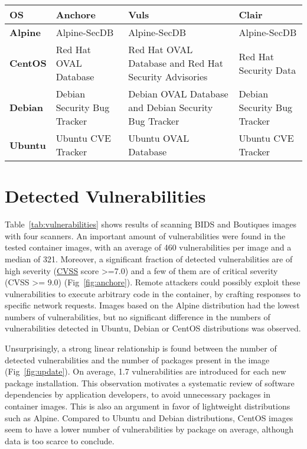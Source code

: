\begin{center}
\tabulinesep=1.2mm
\begin{tabu} to \textwidth { | X[l] | X[l] | X[l] | X[l] | }
 \hline
\textbf{OS} &   \textbf{Anchore} &      \textbf{Vuls} & \textbf{Clair} \\
\hline
        \textbf{Alpine} & Alpine-SecDB &        Alpine-SecDB &  Alpine-SecDB \\
\hline
        \textbf{CentOS} & Red Hat OVAL Database & Red Hat OVAL Database and Red Hat Security Advisories & Red Hat Security Data \\
\hline
        \textbf{Debian} & Debian Security Bug Tracker & Debian OVAL Database and Debian Security Bug Tracker & Debian Security Bug Tracker \\
\hline
        \textbf{Ubuntu} & Ubuntu CVE Tracker &  Ubuntu OVAL Database &  Ubuntu CVE Tracker \\
 \hline
\end{tabu}
\label{tab:databases}
\end{center}
\addtocounter{table}{-1}
\section{Detected Vulnerabilities}

Table~\ref{tab:vulnerabilities} shows results of scanning BIDS and Boutiques 
images with four scanners. 
An important amount of vulnerabilities were found in the tested container
images, with an average of 460 vulnerabilities
per image and a median of 321.
Moreover, a significant fraction of detected vulnerabilities are
of high severity
(\href{https://www.first.org/cvss/specification-document}{CVSS} score
>=7.0) and a few of them are of critical severity (CVSS >= 9.0)
(Fig~\ref{fig:anchore}). Remote
attackers could possibly exploit these vulnerabilities to execute
arbitrary code in the container, by crafting responses to specific network
requests. Images based on the Alpine distribution
had the lowest numbers of vulnerabilities, but no significant difference
in the numbers of vulnerabilities detected in
Ubuntu, Debian or CentOS distributions was observed.

Unsurprisingly, a strong linear relationship is found between the number of
detected vulnerabilities and the number of packages present in the
image (Fig~\ref{fig:update}). On average, 1.7 vulnerabilities are introduced for
each new package installation. This observation motivates a systematic
review of software dependencies by application developers, to avoid
unnecessary packages in container images. This is also an argument in favor of lightweight
distributions such as Alpine. Compared to Ubuntu and Debian distributions,
CentOS images seem to have a lower number of vulnerabilities by package on
average, although data is too scarce to conclude.

